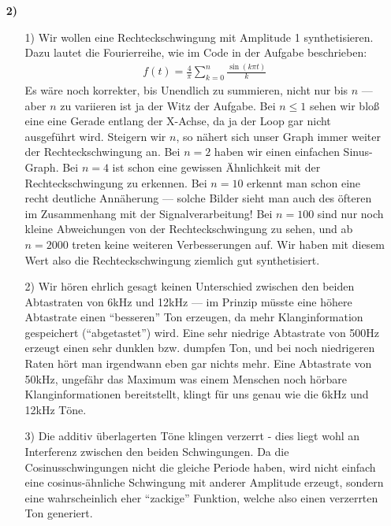 \documentclass[a4paper,11pt]{article}
\begin{document}
\begin{enumerate}
		\item[\textbf{2)}]
		\begin{enumerate}
			\item[1)]
				Wir wollen eine Rechteckschwingung mit Amplitude 1 synthetisieren.
				Dazu lautet die Fourierreihe, wie im Code in der Aufgabe beschrieben:
				\begin{align*}
				f(t) = \frac{4}{\pi} \sum_{k=0}^{n} \frac{\sin(k\pi t)}{k}
				\end{align*}
				Es wäre noch korrekter, bis Unendlich zu summieren, nicht nur bis $n$ ---
				aber $n$ zu variieren ist ja der Witz der Aufgabe.
				Bei $n\leq1$ sehen wir bloß eine eine Gerade entlang der X-Achse,
				da ja der Loop gar nicht ausgeführt wird. Steigern wir $n$, so
				nähert sich unser Graph immer weiter der Rechteckschwingung an.
				Bei $n=2$ haben wir einen einfachen Sinus-Graph. Bei $n=4$ ist
				schon eine gewissen Ähnlichkeit mit der Rechteckschwingung zu
				erkennen. Bei $n=10$ erkennt man schon eine recht deutliche Annäherung
				--- solche Bilder sieht man auch des öfteren im Zusammenhang mit
				der Signalverarbeitung!
				Bei $n=100$ sind nur noch kleine Abweichungen von der Rechteckschwingung
				zu sehen, und ab $n=2000$ treten keine weiteren Verbesserungen auf.
				Wir haben mit diesem Wert also die Rechteckschwingung ziemlich gut
				synthetisiert.
			\item[2)]
				Wir hören ehrlich gesagt keinen Unterschied zwischen den beiden
				Abtastraten von 6kHz und 12kHz --- im Prinzip müsste eine
				höhere Abtastrate einen ``besseren'' Ton erzeugen, da mehr
				Klanginformation gespeichert (``abgetastet'') wird.
				Eine sehr niedrige Abtastrate von 500Hz erzeugt einen sehr
				dunklen bzw. dumpfen Ton, und bei noch niedrigeren Raten hört
				man irgendwann eben gar nichts mehr.
				Eine Abtastrate von 50kHz, ungefähr das Maximum was einem
				Menschen noch hörbare Klanginformationen bereitstellt, klingt
				für uns genau wie die 6kHz und 12kHz Töne.
			\item[3)]
				Die additiv überlagerten Töne klingen verzerrt - dies liegt
				wohl an Interferenz zwischen den beiden Schwingungen. Da die
				Cosinusschwingungen nicht die gleiche Periode haben, wird nicht
				einfach eine cosinus-ähnliche Schwingung mit anderer Amplitude
				erzeugt, sondern eine wahrscheinlich eher ``zackige'' Funktion,
				welche also einen verzerrten Ton generiert.
		\end{enumerate}
	\end{enumerate}
\end{document}
